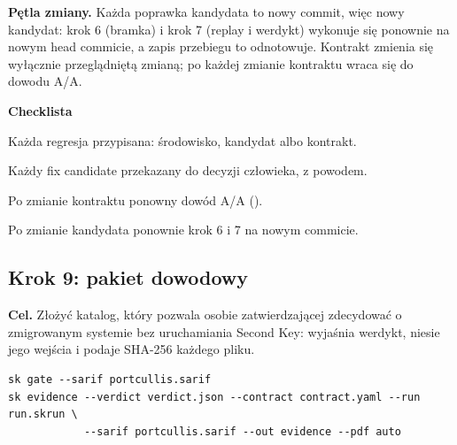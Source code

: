 \textbf{Pętla zmiany.} Każda poprawka kandydata to nowy commit, więc nowy kandydat: krok 6
(bramka) i krok 7 (replay i werdykt) wykonuje się ponownie na nowym head commicie, a zapis
przebiegu to odnotowuje. Kontrakt zmienia się wyłącznie przeglądniętą zmianą; po każdej
zmianie kontraktu wraca się do dowodu A/A.

\textbf{Checklista}
\begin{checklista}
  \item Każda regresja przypisana: środowisko, kandydat albo kontrakt.
  \item Każdy fix candidate przekazany do decyzji człowieka, z powodem.
  \item Po zmianie kontraktu ponowny dowód A/A ().
  \item Po zmianie kandydata ponownie krok 6 i 7 na nowym commicie.
\end{checklista}


\subsection{Krok 9: pakiet dowodowy}\label{sec:procedura-krok9}

\textbf{Cel.} Złożyć katalog, który pozwala osobie zatwierdzającej zdecydować o
zmigrowanym systemie bez uruchamiania Second Key: wyjaśnia werdykt, niesie jego wejścia i
podaje SHA-256 każdego pliku.

\begin{lstlisting}
sk gate --sarif portcullis.sarif
sk evidence --verdict verdict.json --contract contract.yaml --run run.skrun \
            --sarif portcullis.sarif --out evidence --pdf auto
\end{lstlisting}

